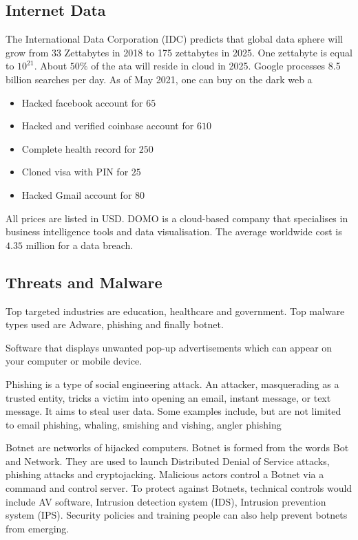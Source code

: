 \documentclass[a4paper]{article}
\theoremstyle{plain}
\theoremstyle{definition}
\newtheorem{defn}{Definition}[section]
\theoremstyle{remark}
\begin{document}
\subsection{Internet Data}
The International Data Corporation (IDC) predicts that global data sphere will grow from 33 Zettabytes in 2018 to 175 zettabytes in 2025. One zettabyte is equal to $10^{21}$. About $50\%$ of the ata will reside in cloud in 2025. Google processes 8.5 billion searches per day. As of May 2021, one can buy on the dark web a
\begin{itemize}
	\item Hacked facebook account for $65$
	\item Hacked and verified coinbase account for $610$ 
	\item Complete health record for $250$ 
	\item Cloned visa with PIN for $25$ 
	\item Hacked Gmail account for $80$
\end{itemize}
All prices are listed in USD. DOMO is a cloud-based company that specialises in business intelligence tools and data visualisation. The average worldwide cost is $4.35$ million for a data breach. 
\subsection{Threats and Malware}
Top targeted industries are education, healthcare and government. Top malware types used are Adware, phishing and finally botnet. 
\begin{tcolorbox}[colback=black!3!white,colframe=black!60!white,title=\begin{defn}Adware \label{Adware}\end{defn}]
Software that displays unwanted pop-up advertisements which can appear on your computer or mobile device.
\end{tcolorbox}
\begin{tcolorbox}[colback=black!3!white,colframe=black!60!white,title=\begin{defn}Phishing \label{Phishing}\end{defn}]
Phishing is a type of social engineering attack. An attacker, masquerading as a trusted entity, tricks a victim into opening an email, instant message, or text message. It aims to steal user data. Some examples include, but are not limited to email phishing, whaling, smishing and vishing, angler phishing
\end{tcolorbox}
	\begin{tcolorbox}[colback=black!3!white,colframe=black!60!white,title=\begin{defn}Botnets \label{Botnets}\end{defn}]
	Botnet are networks of hijacked computers. Botnet is formed from the words Bot and Network. They are used to launch Distributed Denial of Service attacks, phishing attacks and cryptojacking. Malicious actors control a Botnet via a command and control server. To protect against Botnets, technical controls would include AV software, Intrusion detection system (IDS), Intrusion prevention system (IPS). Security policies and training people can also help prevent botnets from emerging.
	\end{tcolorbox}
	
\end{document}
